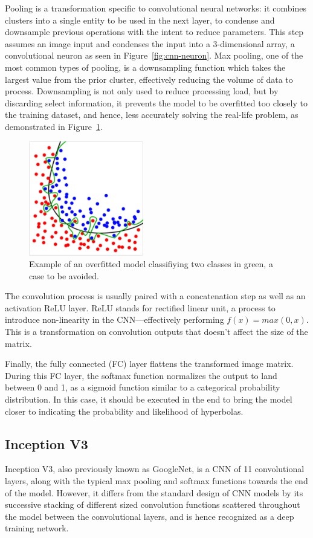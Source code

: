\documentclass[se,blockletter]{uw-wkrpt}
\begin{document}
Pooling is a transformation specific to convolutional neural networks: it combines clusters into a single entity to be used in the next layer, to condense and downsample previous operations with the intent to reduce parameters. This step assumes an image input and condenses the input into a 3-dimensional array, a convolutional neuron as seen in Figure~\ref{fig:cnn-neuron}. Max pooling, one of the most common types of pooling, is a downsampling function which takes the largest value from the prior cluster, effectively reducing the volume of data to process. Downsampling is not only used to reduce processing load, but by discarding select information, it prevents the model to be overfitted too closely to the training dataset, and hence, less accurately solving the real-life problem, as demonstrated in Figure~\ref{fig:overfitting}.

\begin{figure}
  \centering
  \includegraphics[height=5cm]{overfitting}
  \caption{Example of an overfitted model classifiying two classes in green, a case to be avoided.~\cite{ref:}}
  \label{fig:overfitting}
\end{figure}
\pagebreak
The convolution process is usually paired with a concatenation step as well as an activation ReLU layer. ReLU stands for rectified linear unit, a process to introduce non-linearity in the CNN---effectively performing $f(x) = max(0, x)$. This is a transformation on convolution outputs that doesn't affect the size of the matrix. 

Finally, the fully connected (FC) layer flattens the transformed image matrix. During this FC layer, the softmax function normalizes the output to land between 0 and 1, as a sigmoid function similar to a categorical probability distribution. In this case, it should be executed in the end to bring the model closer to indicating the probability and likelihood of hyperbolas. 

\subsection{Inception V3}
Inception V3, also previously known as GoogleNet, is a CNN of 11 convolutional layers, along with the typical max pooling and softmax functions towards the end of the model. However, it differs from the standard design of CNN models by its successive stacking of different sized convolution functions scattered throughout the model between the convolutional layers, and is hence recognized as a deep training network.
\end{document}
